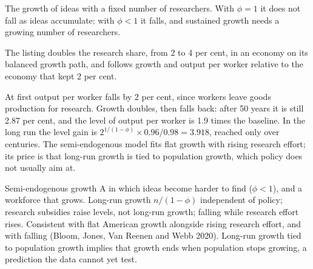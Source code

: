 \begin{omfigure}

{\small The growth of ideas with a fixed number of researchers. With $\phi = 1$ it does not fall as ideas accumulate; with $\phi < 1$ it falls, and sustained
growth needs a growing number of researchers.}
\end{omfigure}

The listing doubles the research share, from 2 to 4 per cent, in an economy on its balanced growth path, and follows growth
and output per worker relative to the economy that kept 2 per cent.

\label{lst:b2:endogenous-growth:ideas}

\label{out:b2:endogenous-growth:ideas}

At first output per worker falls by 2 per cent, since workers leave goods production for research. Growth doubles, then falls back: after
50 years it is still 2.87 per cent, and the level of output per worker is 1.9 times the baseline. In the long run the level gain is $2^{1/(1-\phi)} \times 0.96/0.98 = 3.918$, reached only
over centuries. The semi-endogenous model fits flat growth with rising research effort; its price is that long-run growth
is tied to population growth, which policy does not usually aim at.

\begin{model}{Semi-endogenous growth}
\assumes A  in which ideas become harder to find ($\phi < 1$), and a workforce that grows.
\predicts Long-run growth $n/(1 - \phi)$ independent of policy; research subsidies raise levels, not long-run growth; 
falling while research effort rises.
\tested Consistent with flat American growth alongside rising research effort, and with falling 
(Bloom, Jones, Van Reenen and Webb 2020).
\breaks Long-run growth tied to population growth implies that growth ends when population stops growing, a prediction
the data cannot yet test.
\end{model}

